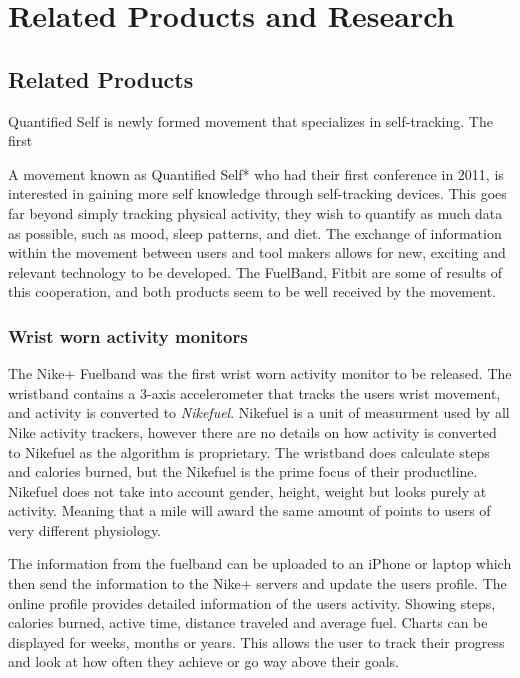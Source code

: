 \chapter{Related Products and Research} %

\label{Chapter3} %


\section{Related Products}
Quantified Self is newly formed movement that specializes  in self-tracking. The first 

A movement known as Quantified Self*\cite{quantifiedSelf} who had their first conference in 2011\cite{bodyHackers}, is interested in gaining more self knowledge through self-tracking devices. This goes far beyond simply tracking physical activity, they wish to quantify as much data as possible, such as mood, sleep patterns, and diet. 
The exchange of information within the movement between users and tool makers allows for new, exciting and relevant technology to be developed. The FuelBand\cite{fuelBand}, Fitbit\cite{fitBit} are some of results of this cooperation, and both products seem to be well received by the movement. %

\subsection{Wrist worn activity monitors}
The Nike+ Fuelband\cite{fuelBand} was the first wrist worn activity monitor to be released. The wristband contains a 3-axis accelerometer that tracks the users wrist movement, and activity is converted to \emph{Nikefuel}. Nikefuel\cite{nikefuel} is a unit of measurment used by all Nike activity trackers, however there are no details on how activity is converted to Nikefuel as the algorithm is proprietary. The wristband does calculate steps and calories burned, but the Nikefuel is the prime focus of their productline. Nikefuel does not take into account gender, height, weight but looks purely at activity. Meaning that a mile will award the same amount of points to users of very different physiology.

The information from the fuelband can be uploaded to an iPhone or laptop which then send the information to the Nike+ servers and update the users profile. The online profile provides detailed information of the users activity. Showing steps, calories burned, active time, distance traveled and average fuel. Charts can be displayed for weeks, months or years. This allows the user to track their progress and look at how often they achieve or go way above their goals.\cite{fuelbandTechSpce} 

